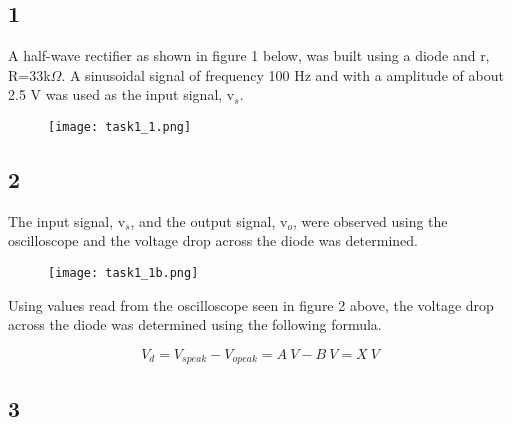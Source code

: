 \subsection*{1}

    A half-wave rectifier as shown in figure 1 below, was built using a  diode and r, R=33k$\Omega$.
    A sinusoidal signal of frequency 100 Hz and with a amplitude of about 2.5 V was used as the input signal, v$_s$.\\

    \begin{figure}[h!]
        \centering
        \texttt{[image: task1\_1.png]}
    \end{figure}

\subsection*{2}

    The input signal, v$_s$, and the output signal, v$_o$, were observed using the oscilloscope and the voltage drop across the diode was determined.\\

    \begin{figure}[h!]
        \centering
        \texttt{[image: task1\_1b.png]}
    \end{figure}

    Using values read from the oscilloscope seen in figure 2 above, the voltage drop across the diode was determined using the following formula.

    $$V_d = V_{s peak} - V_{o peak} = A\ V - B\ V = X\ V$$

\subsection*{3}

